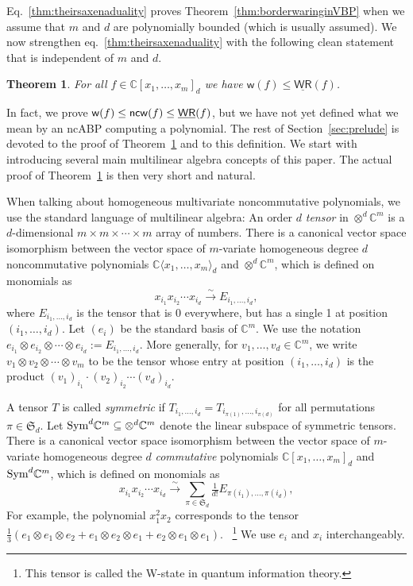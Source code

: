 \documentclass[10pt,a4paper]{article}
\numberwithin{equation}{section}
\newtheorem{theorem}[equation]{Theorem}
\theoremstyle{definition}
\newcommand{\Sym}{\textup{Sym}}
\newcommand{\IC}{\mathbb{C}}
\newcommand{\aS}{\mathfrak{S}}
\newcommand{\ncw}{\textup{\textsf{ncw}}}
\newcommand{\wW}{{\mathsf{w}}}
\newcommand{\WRbar}{\underline{\mathsf{WR}}}
\begin{document}
Eq.~\eqref{thm:theirsaxenaduality} proves Theorem~\ref{thm:borderwaringinVBP} when we assume that $m$ and $d$ are polynomially bounded (which is usually assumed).
We now strengthen eq.~\eqref{thm:theirsaxenaduality} with the following clean statement that is independent of $m$ and $d$.

\begin{theorem}\label{thm:oursaxenaduality}
For all $f \in \IC[x_1,\ldots,x_m]_d$ we have $\wW(f) \leq \WRbar(f)$.
\end{theorem}

In fact, we prove
$\wW(f) \leq \ncw(f) \leq \WRbar(f)$, but we have not yet defined what we mean by an ncABP computing a polynomial.
The rest of Section~\ref{sec:prelude} is devoted to the proof of Theorem~\ref{thm:oursaxenaduality} and to this definition. We start with introducing several main multilinear algebra concepts of this paper. The actual proof of Theorem~\ref{thm:oursaxenaduality} is then very short and natural.

When talking about homogeneous multivariate noncommutative polynomials, we use the standard language of multilinear algebra: An order $d$ \emph{tensor} in $\otimes^d \IC^m$ is a $d$-dimensional $m \times m \times \cdots \times m$ array of numbers.
There is a canonical vector space isomorphism between the vector space of $m$-variate homogeneous degree $d$ noncommutative polynomials $\IC\langle x_1,\ldots,x_m\rangle_d$ and $\otimes^d \IC^m$, which is defined on monomials as
\[
x_{i_1} x_{i_2} \cdots x_{i_d} \stackrel{\sim}{\longrightarrow} E_{i_1,\ldots,i_d},
\]
where $E_{i_1,\ldots,i_d}$ is the tensor that is 0 everywhere, but has a single 1 at position $(i_1,\ldots,i_d)$.
Let $(e_i)$ be the standard basis of $\IC^m$. We use the notation $e_{i_1}\otimes e_{i_2}\otimes \cdots \otimes e_{i_d} := E_{i_1,\ldots,i_d}$.
More generally, for $v_1,\ldots,v_d \in \IC^m$, we write $v_1 \otimes v_2 \otimes \cdots \otimes v_m$ to be the tensor whose entry at position $(i_1,\ldots,i_d)$ is the product $(v_1)_{i_1}\cdot (v_2)_{i_2} \cdots (v_d)_{i_d}$.

A tensor $T$ is called \emph{symmetric} if $T_{i_1,\ldots,i_d} = T_{i_{\pi(1)},\ldots,i_{\pi(d)}}$ for all permutations $\pi \in \aS_d$. Let $\Sym^d \IC^m \subseteq \otimes^d \IC^m$ denote the linear subspace of symmetric tensors.
There is a canonical vector space isomorphism between the vector space of $m$-variate homogeneous degree $d$ \emph{commutative} polynomials $\IC[x_1,\ldots,x_m]_d$ and $\Sym^d \IC^m$, which is defined on monomials as
\[
x_{i_1} x_{i_2} \cdots x_{i_d} \stackrel{\sim}{\longrightarrow} \sum_{\pi \in \aS_d} \tfrac{1}{d!} E_{\pi(i_1),\ldots,\pi(i_d)},
\]
For example, the polynomial $x_1^2 x_2$ corresponds to the tensor $\frac 1 3 (e_1 \otimes e_1 \otimes e_2 + e_1 \otimes e_2 \otimes e_1 + e_2 \otimes e_1 \otimes e_1)$. \ \footnote{This tensor is called the W-state in quantum information theory.}
We use $e_i$ and $x_i$ interchangeably.
\end{document}
